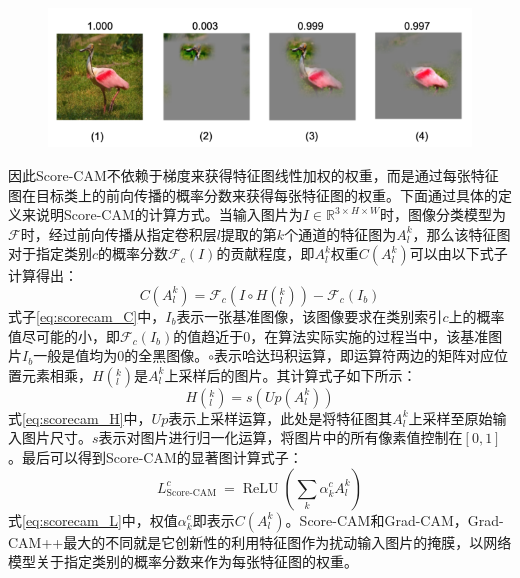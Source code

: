 \begin{figure}[h]
	\centering 
	\includegraphics[width=12cm]{fig/ch2/scorecam1.png}
	\label{fig:scorecam1}
\end{figure}

因此Score-CAM不依赖于梯度来获得特征图线性加权的权重，而是通过每张特征图在目标类上的前向传播的概率分数来获得每张特征图的权重。下面通过具体的定义来说明Score-CAM的计算方式。当输入图片为$I \in \mathbb{R}^{3\times H \times W}$时，图像分类模型为$\mathcal{F}$时，经过前向传播从指定卷积层$l$提取的第$k$个通道的特征图为$A^k_l$，那么该特征图对于指定类别$c$的概率分数$\mathcal{F}_c(I)$的贡献程度，即$A^k_l$权重$C(A^k_l)$可以由以下式子计算得出：
\begin{equation}
	C(A^k_l)=\mathcal{F}_c(I \circ H(^k_l))-\mathcal{F}_c(I_b)
	\label{eq:scorecam_C}
\end{equation}
式子\ref{eq:scorecam_C}中，$I_b$表示一张基准图像，该图像要求在类别索引$c$上的概率值尽可能的小，即$\mathcal{F}_c(I_b)$的值趋近于0，在算法实际实施的过程当中，该基准图片$I_b$一般是值均为0的全黑图像。$\circ$表示哈达玛积运算，即运算符两边的矩阵对应位置元素相乘，$H(^k_l)$是$A^k_l$上采样后的图片。其计算式子如下所示：
\begin{equation}
	H(^k_l)=s(U\!p(A^k_l))
	\label{eq:scorecam_H}
\end{equation}
式\ref{eq:scorecam_H}中，$U\!p$表示上采样运算，此处是将特征图其$A^k_l$上采样至原始输入图片尺寸。$s$表示对图片进行归一化运算，将图片中的所有像素值控制在$[0,1]$。最后可以得到Score-CAM的显著图计算式子：
\begin{equation}
	L_{\text {Score-CAM }}^{c}=\operatorname{ReLU}\left(\sum_{k} \alpha_{k}^{c} A_{l}^{k}\right)
	\label{eq:scorecam_L}
\end{equation}
式\ref{eq:scorecam_L}中，权值$\alpha_{k}^{c}$即表示$C(A^k_l)$。Score-CAM和Grad-CAM，Grad-CAM++最大的不同就是它创新性的利用特征图作为扰动输入图片的掩膜，以网络模型关于指定类别的概率分数来作为每张特征图的权重。


